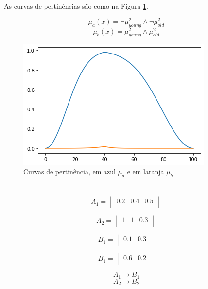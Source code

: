 \documentclass[conference]{IEEEtran}
\newcommand\w{1.0}
\begin{document}
\hfill
\section{}  %

\par As curvas de pertinências são como na Figura \ref{fig:plot04}.

\[\mu_{a}(x) = \neg \mu_{young}^2 \wedge \neg \mu_{old}^2\]
\[\mu_{b}(x) = \mu_{young}^2 \wedge \mu_{old}^2\]

\begin{figure}[htbp]
\centering
\includegraphics[width=\w\linewidth]{fig/plot04.png}
\caption{Curvas de pertinência, em azul $\mu_{a}$ e em laranja $\mu_{b}$}
\label{fig:plot04}
\end{figure}

\hfill
\section{}  %

\[
A_1 = 
\begin{vmatrix}
0.2 & 0.4 & 0.5 \\
\end{vmatrix}
\]

\[
A_2 = 
\begin{vmatrix}
1 & 1 & 0.3 \\
\end{vmatrix}
\]

\[
B_1 = 
\begin{vmatrix}
0.1 & 0.3 \\
\end{vmatrix}
\]

\[
B_1 = 
\begin{vmatrix}
0.6 & 0.2 \\
\end{vmatrix}
\]

\[A_1 \rightarrow B_1\]
\[A_2 \rightarrow B_2\]
\end{document}
